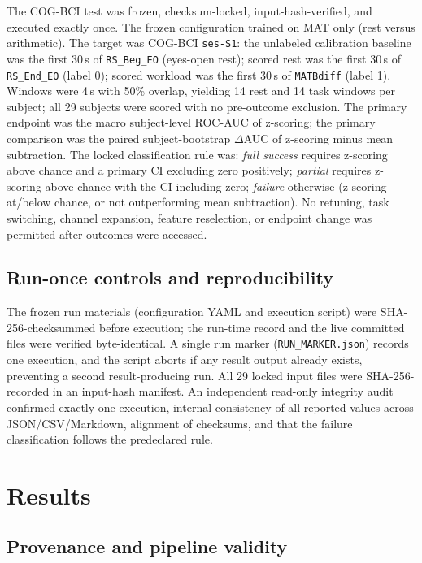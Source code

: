 \documentclass[11pt]{article}
\begin{document}
The COG-BCI test was frozen, checksum-locked, input-hash-verified, and executed
exactly once. The frozen configuration trained on MAT only (rest versus
arithmetic). The target was COG-BCI \texttt{ses-S1}: the unlabeled
calibration baseline was the first 30\,s of \texttt{RS\_Beg\_EO} (eyes-open
rest); scored rest was the first 30\,s of \texttt{RS\_End\_EO} (label 0); scored
workload was the first 30\,s of \texttt{MATBdiff} (label 1). Windows were 4\,s
with 50\% overlap, yielding 14 rest and 14 task windows per subject; all 29
subjects were scored with no pre-outcome exclusion. The primary endpoint was the
macro subject-level ROC-AUC of z-scoring; the primary comparison was the paired
subject-bootstrap $\Delta$AUC of z-scoring minus mean subtraction. The locked
classification rule was: \emph{full success} requires z-scoring above chance and
a primary CI excluding zero positively; \emph{partial} requires z-scoring above
chance with the CI including zero; \emph{failure} otherwise (z-scoring at/below
chance, or not outperforming mean subtraction). No retuning, task switching,
channel expansion, feature reselection, or endpoint change was permitted after
outcomes were accessed.

\subsection{Run-once controls and reproducibility}

The frozen run materials (configuration YAML and execution script) were
SHA-256-checksummed before execution; the run-time record and the live committed
files were verified byte-identical. A single run marker
(\texttt{RUN\_MARKER.json}) records one execution, and the script aborts if any
result output already exists, preventing a second result-producing run. All 29
locked input files were SHA-256-recorded in an input-hash manifest. An
independent read-only integrity audit confirmed exactly one execution, internal
consistency of all reported values across JSON/CSV/Markdown, alignment of
checksums, and that the failure classification follows the predeclared rule.

\section{Results}

\subsection{Provenance and pipeline validity}
\end{document}
